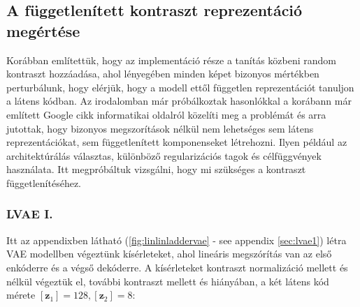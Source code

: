 \documentclass[12pt, english]{article}
\begin{document}
\vspace{7mm}

\subsection{A függetlenített kontraszt reprezentáció megértése}

\vspace{5mm}

\par Korábban említettük, hogy az implementáció része a tanítás közbeni random kontraszt hozzáadása, ahol lényegében minden képet bizonyos mértékben perturbálunk, hogy elérjük, hogy a modell ettől független reprezentációt tanuljon a látens kódban. Az irodalomban már próbálkoztak hasonlókkal a korábann már említett Google cikk \cite{locatello2018challenging} informatikai oldalról közelíti meg a problémát és arra jutottak, hogy bizonyos megszorítások nélkül nem lehetséges sem látens reprezentációkat, sem függetlenített komponenseket létrehozni. Ilyen például az architektúrálás választas, különböző regularizációs tagok és célfüggvények használata. Itt megpróbáltuk vizsgálni, hogy mi szükséges a kontraszt függetlenítéséhez.

\vspace{4mm}

\subsubsection{LVAE I.}

\vspace{4mm}

\par Itt az appendixben látható (\ref{fig:linlinladdervae} - see appendix \ref{sec:lvae1}) létra VAE modellben végeztünk kísérleteket, ahol lineáris megszórítás van az első enkóderre és a végső dekóderre. A kísérleteket kontraszt normalizáció mellett és nélkül végeztük el, további kontraszt mellett és hiányában, a két látens kód mérete $[\bm{z}_{1}] = 128, [\bm{z}_{2}] = 8$:

\vspace{4mm}
\end{document}
